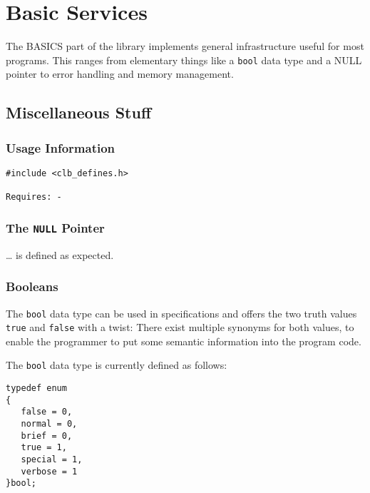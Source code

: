 %
%
%
% 
% 
%
%


\section{Basic Services}
\label{sec:basics}

The BASICS part of the library implements general infrastructure
useful for most programs. This ranges from elementary things like a
\texttt{bool} data type and a NULL pointer to error handling and
memory management.


\subsection{Miscellaneous Stuff}
\label{sec:basics:elementary}


\subsubsection{Usage Information}

\begin{verbatim}
#include <clb_defines.h>

Requires: -
\end{verbatim}

\subsubsection{The \texttt{NULL} Pointer}

\ldots{} is defined as expected. 


\subsubsection{Booleans}

The \texttt{bool} data type can be used in specifications and offers
the two truth values \texttt{true} and \texttt{false} with a twist:
There exist multiple synonyms for both values, to enable the
programmer to put some semantic information into the program code.

The \texttt{bool} data type is currently defined as follows:

\begin{verbatim}
typedef enum
{
   false = 0,
   normal = 0,
   brief = 0,
   true = 1,
   special = 1,
   verbose = 1
}bool;
\end{verbatim}


